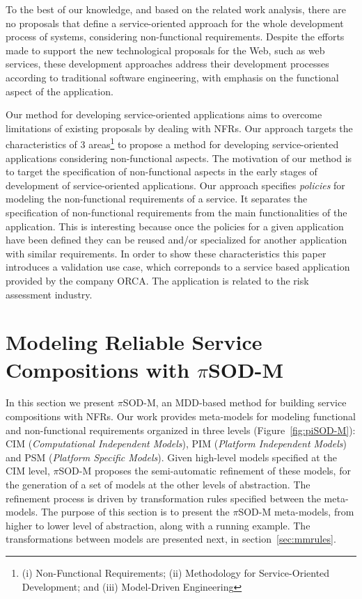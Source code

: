 \documentclass{singlecol-new}
\theoremstyle{TH}{
\newtheorem{lemma}{Lemma}
\newtheorem{theorem}[lemma]{Theorem}
\newtheorem{corrolary}[lemma]{Corrolary}
\newtheorem{conjecture}[lemma]{Conjecture}
\newtheorem{proposition}[lemma]{Proposition}
\newtheorem{claim}[lemma]{Claim}
\newtheorem{stheorem}[lemma]{Wrong Theorem}
\newtheorem{algorithm}{Algorithm}
}
\theoremstyle{THrm}{
\newtheorem{definition}{Definition}[section]
\newtheorem{question}{Question}[section]
\newtheorem{remark}{Remark}
\newtheorem{scheme}{Scheme}
}
\theoremstyle{THhit}{
\newtheorem{case}{Case}[section]
}
\theoremstyle{THhsl}{
\newtheorem{example}{Example}
}
\newcommand{\pisodm}[0]{$\pi$SOD-M\xspace}
\begin{document}
To the best of our knowledge, and based on the related work analysis, there are no proposals that define a service-oriented approach for the whole development process of systems, considering
non-functional requirements. Despite the efforts  made to support the new
technological proposals for the Web, such as web services,  these
development approaches address their development processes according to traditional software
engineering, with emphasis on the functional aspect of the
application.

Our method for developing service-oriented applications aims to overcome  limitations of existing  proposals by dealing with NFRs.  
Our approach targets the characteristics of  3
areas\footnote{(i) Non-Functional Requirements; (ii) Methodology for Service-Oriented Development;
and (iii) Model-Driven Engineering} to propose a method for
developing service-oriented applications considering non-functional aspects.
The motivation of our method is to target the specification of non-functional aspects in the early stages of development of service-oriented  applications. Our approach specifies \textit{policies} for modeling the non-functional requirements of a service. It separates the specification of non-functional requirements from the main functionalities of the application. This is interesting because once the policies for a given application have been defined they can be reused and/or specialized for another application with similar requirements. In order to show these characteristics this paper introduces a validation use case, which correponds to  a service based application provided  by the company ORCA. The application is related to the risk assessment industry.



\section{Modeling Reliable Service Compositions with \pisodm}\label{sec:motivation}

In this section we present \pisodm, an MDD-based method for building service compositions with NFRs.
Our work provides meta-models for modeling functional and non-functional requirements organized in three levels (Figure~\ref{fig:piSOD-M}): CIM (\textit{Computational Independent Models}), PIM (\textit{Plat\-form Independent Models}) and PSM (\textit{Platform Specific Models}).
Given  high-level models specified at the CIM level, \pisodm proposes the semi-automatic refinement of these models, for the generation of a set of models at the other levels of abstraction.
The refinement process is driven by transformation rules specified between the meta-models.
%
The purpose of this section is to present the \pisodm me\-ta-models, from higher to lower level of abstraction, along with a running example.
The transformations between models are presented next, in section~\ref{sec:mmrules}.
\end{document}
